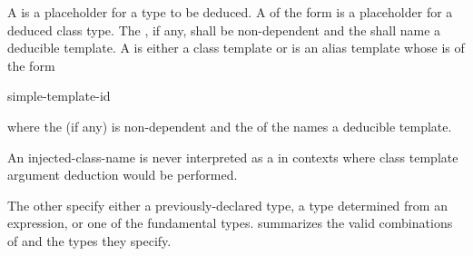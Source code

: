 \pnum
{}%
%
%
%
%
%
%
%
%
%
%
%
%
%
%
%
A 
is a placeholder for
a type to be deduced.
%
A  of the form
  
is a placeholder for
a deduced class type.
The , if any, shall be non-dependent and
the  shall name a deducible template.
A  is either a class template or
is an alias template whose  is of the form

\begin{ncsimplebnf}
   simple-template-id
\end{ncsimplebnf}

where the  (if any) is non-dependent and
the  of the 
names a deducible template.
\begin{note}
An injected-class-name is never interpreted as a 
in contexts where class template argument deduction would be performed.
\end{note}
The other
specify either a previously-declared type, a type determined from an
expression, or one of the
fundamental types.
 summarizes the valid combinations of
and the types they specify.


